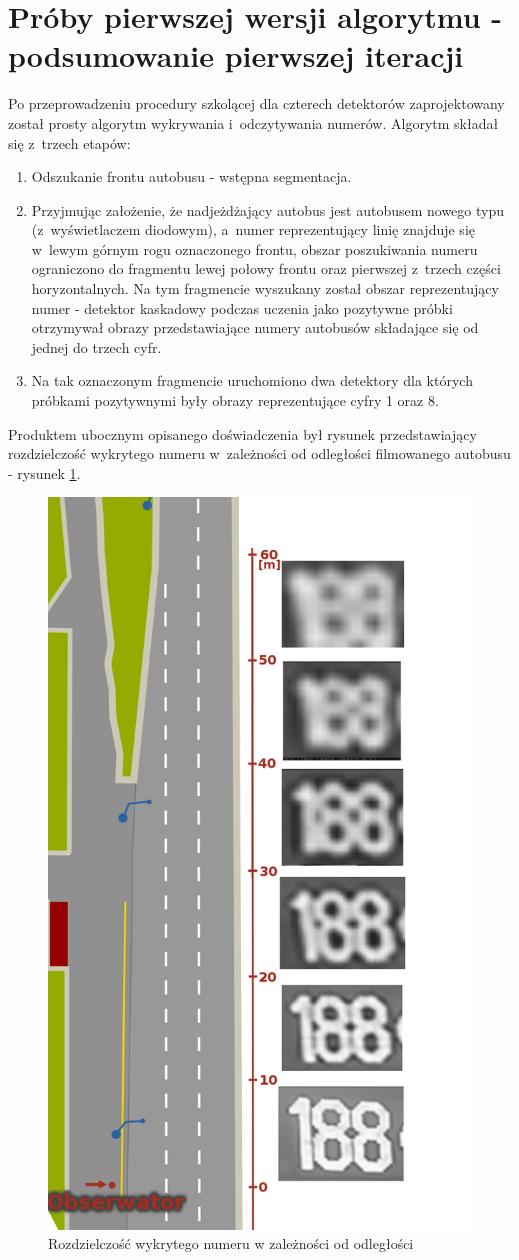 \section{Próby pierwszej wersji algorytmu - podsumowanie pierwszej iteracji}

Po przeprowadzeniu procedury szkolącej dla czterech detektorów
zaprojektowany został prosty algorytm wykrywania i~odczytywania numerów.
Algorytm składał się z~trzech etapów:

\begin{enumerate}
    \item Odszukanie frontu autobusu - wstępna segmentacja.
    \item Przyjmując założenie, że nadjeżdżający autobus jest autobusem
        nowego typu (z~wyświetlaczem diodowym), a~numer reprezentujący
        linię znajduje się w~lewym górnym rogu oznaczonego frontu,
        obszar poszukiwania numeru ograniczono do fragmentu lewej połowy
        frontu oraz pierwszej z~trzech części horyzontalnych. Na tym 
        fragmencie wyszukany został obszar reprezentujący numer -
        detektor kaskadowy podczas uczenia jako pozytywne próbki
        otrzymywał obrazy przedstawiające numery autobusów składające
        się od jednej do trzech cyfr.
    \item Na tak oznaczonym fragmencie uruchomiono dwa detektory
        dla których próbkami pozytywnymi były obrazy reprezentujące
        cyfry 1 oraz 8.
\end{enumerate}

Produktem ubocznym opisanego doświadczenia był rysunek
przedstawiający rozdzielczość wykrytego numeru w~zależności
od odległości filmowanego autobusu - rysunek \ref{fig:dist2res}.

\begin{figure}[!h]
    \centering
    \includegraphics[height=0.9\textwidth]{img/exp_numer_od_odleglosci}
    \caption{Rozdzielczość wykrytego numeru w zależności od odległości}
    \label{fig:dist2res}
\end{figure}

